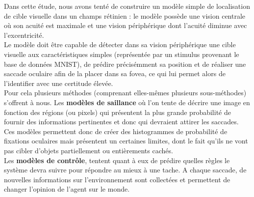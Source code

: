 Dans cette étude, nous avons tenté de construire un modèle simple de localisation de cible visuelle dans un champs rétinien : le modèle possède une vision centrale où son acuité est maximale et une vision périphérique dont l'acuité diminue avec l'excentricité.\\
Le modèle doit être capable de détecter dans sa vision périphérique une cible visuelle aux caractéristiques simples (représentée par un stimulus provenant le base de données MNIST), de prédire précisémment sa position et de réaliser une saccade oculaire afin de la placer dans sa fovea, ce qui lui permet alors de l'identifier avec une certitude élevée.\\
Pour cela plusieurs méthodes (comprenant elles-mêmes plusieurs sous-méthodes) s'offrent à nous. Les \textbf{modèles de saillance} où l'on tente de décrire une image en fonction des régions (ou pixels) qui présentent la plus grande probabilité de fournir des informations pertinentes et donc qui devraient attirer les saccades. Ces modèles permettent donc de créer des histogrammes de probabilité de fixations oculaires mais présentent un certaines limites, dont le fait qu'ils ne vont pas cibler d'objets partiellement ou entièrements cachés\autocite{Butko2010}.\\
Les \textbf{modèles de contrôle}, tentent quant à eux de prédire quelles règles le système devra suivre pour répondre au mieux à une tache. A chaque saccade, de nouvelles informations sur l'environnement sont collectées et permettent de changer l'opinion de l'agent sur le monde\autocite{Butko2010}.
